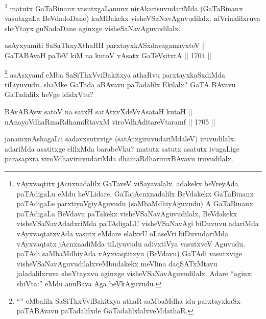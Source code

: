\begin{artha}
\footnote{vAyxvaqtitx jAcnxnadalilx GaTaveV viSayavalalx. adakekx beVreyAda paTAdigaLu eMdu heVLidare, GaTajAcnxnadalilx BeVdakekx GaTaBinanx paTAdigaLe parxtiyoVgiyAguvudu (saMbaMdhiyAguvudu) A GaTaBinanx paTAdigaLa BeVdavu paTakekx visheVSaNavAguvudilalx, BeVdakekx visheVSaNavAdadxriMda paTAdigaLU visheVSaNavAgi biDuvuvu adariMda vAyxvaqtatxvAda vasutx eMdare elalxvU oLaseVri biDuvudariMda vAyxvaqtatx jAcnxnadiMda tiLiyuvudu adivxtiVya vasutxveV Aguvudu. paTAdi saMbaMdhiyAda vAyxvaqtitxyu (BeVdavu) GaTAdi vasutxvige visheVSaNavAguvudilalxveMbudakekx meVlina daqSATxMtavu jaladalilxruva sheYtayxvu aginxge visheVSaNavAguvudilalx. Adare ``aginx: shiVta:'' eMdu anuBava Aga beVkAguvudu.}
matutx GaTaBinanx vasutxgaLanunx nirAkarisuvudariMda (GaTaBinanx vasutxgaLa BeVdadoDane) kuMBakekx visheVSaNavAguvudilalx. niVrinalilxruva sheYtayx guNadoDane aginxge visheSaNavAguvudilalx.
\end{artha}


\begin{shl}
asAyxyamiti SaSaThxyXthaRH parxtayxkASxdavagamayxteV || \\
GaTABAvaH paTeV kiM na kutoV vA\s satx GaTeV\s sitxtA ||  1704 ||  
\end{shl}

\begin{artha}
\footnote{``\stext'' eMbalilx SaSiThxVviBakitxya athaR saMbaMdha idu parxtayxkaSx paTABAvavu paTadalilxde GaTadalilxlalxveMdathaR.}
asAsxyamf eMba SaSiThxVviBakitxya athaRvu parxtayxkaSxdiMda tiLiyuvudu. shaMke GaTada aBAvavu paTadalilx Ekilalx? GaTA BAvavu GaTadalilx heVge ididxVtu?
\end{artha}


\begin{shl}
BAvABAvw satoV na satxH satAtxvXdeVvAsataH kutaH || \\
nAnayoVdhaRmaRdhamiRtavxM viroVdhAditareVtaramf ||  1705 ||  
\end{shl}

\begin{artha}
janamxnAshagaLu sadavxsutxvige (satAtxgiruvudariMdaleV) iruvudilalx. adariMda asatitxge elilxMda barabeVku? matutx satutx asatutx ivugaLige parasapxra viroVdhaviruvudariMda dhamaRdharimxBAvavu iruvudilalx.
\end{artha}

